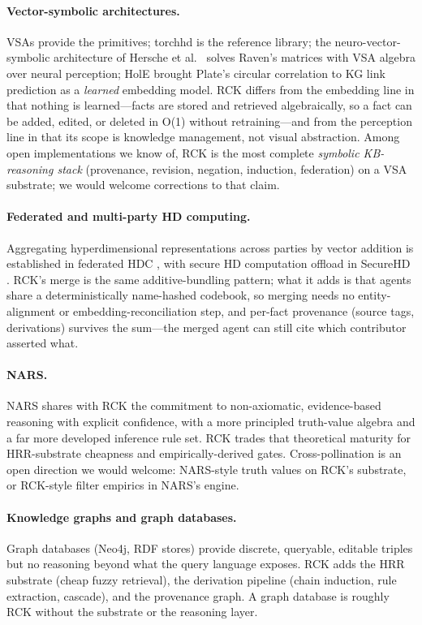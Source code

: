 \documentclass[11pt]{article}
\begin{document}
\paragraph{Vector-symbolic architectures.} VSAs \cite{kanerva2009,
plate1995} provide the primitives; torchhd \cite{heddes2023torchhd}
is the reference library; the neuro-vector-symbolic architecture of
Hersche et al.\ \cite{hersche2023nvsa} solves Raven's matrices with
VSA algebra over neural perception; HolE \cite{nickel2016hole}
brought Plate's circular correlation to KG link prediction as a
\emph{learned} embedding model. RCK differs from the embedding line
in that nothing is learned---facts are stored and retrieved
algebraically, so a fact can be added, edited, or deleted in O(1)
without retraining---and from the perception line in that its scope
is knowledge management, not visual abstraction. Among open
implementations we know of, RCK is the most complete \emph{symbolic
KB-reasoning stack} (provenance, revision, negation, induction,
federation) on a VSA substrate; we would welcome corrections to that
claim.

\paragraph{Federated and multi-party HD computing.} Aggregating
hyperdimensional representations across parties by vector addition
is established in federated HDC \cite{fedhdc2023}, with secure HD
computation offload in SecureHD \cite{imani2019securehd}. RCK's
merge is the same additive-bundling pattern; what it adds is that
agents share a deterministically name-hashed codebook, so merging
needs no entity-alignment or embedding-reconciliation step, and
per-fact provenance (source tags, derivations) survives the
sum---the merged agent can still cite which contributor asserted
what.

\paragraph{NARS.} NARS \cite{wang2006} shares with RCK the
commitment to non-axiomatic, evidence-based reasoning with explicit
confidence, with a more principled truth-value algebra and a far
more developed inference rule set. RCK trades that theoretical
maturity for HRR-substrate cheapness and empirically-derived gates.
Cross-pollination is an open direction we would welcome: NARS-style
truth values on RCK's substrate, or RCK-style filter empirics in
NARS's engine.

\paragraph{Knowledge graphs and graph databases.} Graph databases
(Neo4j, RDF stores) provide discrete, queryable, editable triples
but no reasoning beyond what the query language exposes. RCK adds
the HRR substrate (cheap fuzzy retrieval), the derivation pipeline
(chain induction, rule extraction, cascade), and the provenance
graph. A graph database is roughly RCK without the substrate or
the reasoning layer.
\end{document}

